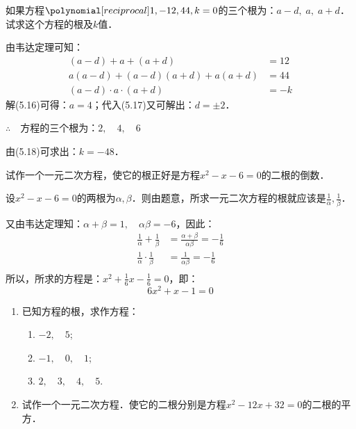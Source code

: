 \begin{example}
    如果方程$\poly{1,-12,44,k}=0$的三个根为：$a-d,\; a,\; a+d$．试求这个方程的根及$k$值．
\end{example}

\begin{solution}
    由韦达定理可知：
\begin{align}
(a-d)+a+(a+d)&=12\\
a(a-d)+(a-d)(a+d)+a(a+d)&=44\\
(a-d)\cdot a\cdot (a+d)&=-k
\end{align}
解(5.16)可得：$a=4$；代入(5.17)又可解出：$d=\pm 2$．

$\therefore\quad $方程的三个根为：$2,\quad 4,\quad 6$

由(5.18)可求出：$k=-48$．
\end{solution}

\begin{example}
试作一个一元二次方程，使它的根正好是方程$x^2-x-6=0$的二根的倒数．
\end{example}


\begin{solution}
设$x^2-x-6=0$的两根为$\alpha,\beta$．则由题意，所求一元二次方程的根就应该是$\frac{1}{\alpha},\frac{1}{\beta}$．

又由韦达定理知：$\alpha+\beta=1,\quad \alpha\beta=-6$，因此：
\[\begin{split}
    \frac{1}{\alpha}+\frac{1}{\beta}&=\frac{\alpha+\beta}{\alpha\beta}=-\frac{1}{6}\\
    \frac{1}{\alpha}\cdot \frac{1}{\beta}&=\frac{1}{\alpha\beta}=-\frac{1}{6}\\
\end{split}\]
所以，所求的方程是：$x^2+\frac{1}{6}x-\frac{1}{6}=0$，即：
\[ 6x^2+x-1=0 \]
\end{solution}


\begin{ex}
\begin{enumerate}
    \item 已知方程的根，求作方程：
    \begin{enumerate}
        \item $-2,\quad  5$;
        \item $-1,\quad 0,\quad 1$;
        \item $2,\quad 3,\quad 4,\quad 5$.
    \end{enumerate}
    \item 试作一个一元二次方程．使它的二根分别是方程$x^2-12x+32=0$的二根的平方．
\end{enumerate}
\end{ex}

